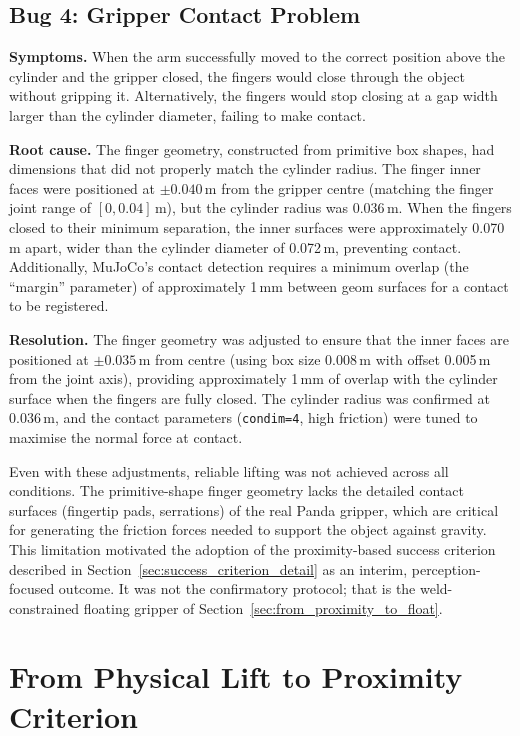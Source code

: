 \documentclass[11pt,a4paper]{report}
\begin{document}
\subsection{Bug 4: Gripper Contact Problem}
\label{sec:bug_gripper}

\textbf{Symptoms.} When the arm successfully moved to the correct position above the cylinder and the gripper closed, the fingers would close through the object without gripping it. Alternatively, the fingers would stop closing at a gap width larger than the cylinder diameter, failing to make contact.

\textbf{Root cause.} The finger geometry, constructed from primitive box shapes, had dimensions that did not properly match the cylinder radius. The finger inner faces were positioned at $\pm 0.040$\,m from the gripper centre (matching the finger joint range of $[0, 0.04]$\,m), but the cylinder radius was 0.036\,m. When the fingers closed to their minimum separation, the inner surfaces were approximately 0.070\,m apart, wider than the cylinder diameter of 0.072\,m, preventing contact. Additionally, MuJoCo's contact detection requires a minimum overlap (the ``margin'' parameter) of approximately 1\,mm between geom surfaces for a contact to be registered.

\textbf{Resolution.} The finger geometry was adjusted to ensure that the inner faces are positioned at $\pm 0.035$\,m from centre (using box size 0.008\,m with offset 0.005\,m from the joint axis), providing approximately 1\,mm of overlap with the cylinder surface when the fingers are fully closed. The cylinder radius was confirmed at 0.036\,m, and the contact parameters (\texttt{condim=4}, high friction) were tuned to maximise the normal force at contact.

Even with these adjustments, reliable lifting was not achieved across all conditions. The primitive-shape finger geometry lacks the detailed contact surfaces (fingertip pads, serrations) of the real Panda gripper, which are critical for generating the friction forces needed to support the object against gravity. This limitation motivated the adoption of the proximity-based success criterion described in Section~\ref{sec:success_criterion_detail} as an interim, perception-focused outcome. It was not the confirmatory protocol; that is the weld-constrained floating gripper of Section~\ref{sec:from_proximity_to_float}.

\section{From Physical Lift to Proximity Criterion}
\label{sec:lift_to_proximity}
\end{document}
